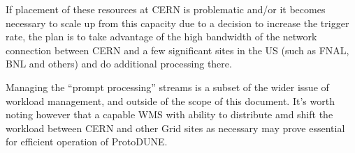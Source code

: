 \documentclass[pdftex,12pt,letter]{article}
\newcommand{\pd}{ProtoDUNE\xspace}
\begin{document}
If placement of these resources at CERN is problematic and/or it becomes necessary to scale up from
this capacity due to a decision to increase the trigger rate,
the plan is to take advantage of the high bandwidth of the network connection between
CERN and a few significant sites in the US (such as FNAL, BNL and others) and do additional processing there.

Managing the ``prompt processing'' streams is a subset of the wider issue of workload management, and outside of
the scope of this document. It's worth noting however that a capable WMS with ability to distribute amd shift the
workload between CERN and other Grid sites as necessary may prove essential for efficient operation of \pd.


\end{document}
